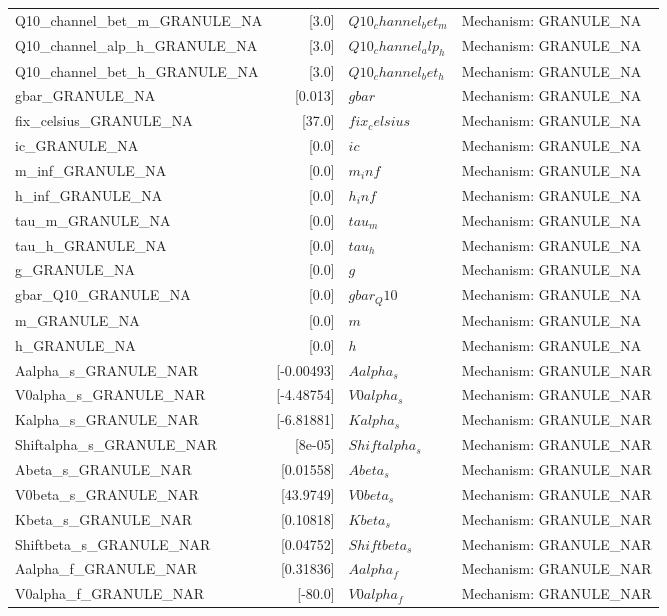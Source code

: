 \begin{tabular}{|l|r|l|l|}
Q10_channel_bet_m_GRANULE_NA & [3.0] & $Q10_channel_bet_m$ & Mechanism: GRANULE_NA \\
Q10_channel_alp_h_GRANULE_NA & [3.0] & $Q10_channel_alp_h$ & Mechanism: GRANULE_NA \\
Q10_channel_bet_h_GRANULE_NA & [3.0] & $Q10_channel_bet_h$ & Mechanism: GRANULE_NA \\
gbar_GRANULE_NA & [0.013] & $gbar$ & Mechanism: GRANULE_NA \\
fix_celsius_GRANULE_NA & [37.0] & $fix_celsius$ & Mechanism: GRANULE_NA \\
ic_GRANULE_NA & [0.0] & $ic$ & Mechanism: GRANULE_NA \\
m_inf_GRANULE_NA & [0.0] & $m_inf$ & Mechanism: GRANULE_NA \\
h_inf_GRANULE_NA & [0.0] & $h_inf$ & Mechanism: GRANULE_NA \\
tau_m_GRANULE_NA & [0.0] & $tau_m$ & Mechanism: GRANULE_NA \\
tau_h_GRANULE_NA & [0.0] & $tau_h$ & Mechanism: GRANULE_NA \\
g_GRANULE_NA & [0.0] & $g$ & Mechanism: GRANULE_NA \\
gbar_Q10_GRANULE_NA & [0.0] & $gbar_Q10$ & Mechanism: GRANULE_NA \\
m_GRANULE_NA & [0.0] & $m$ & Mechanism: GRANULE_NA \\
h_GRANULE_NA & [0.0] & $h$ & Mechanism: GRANULE_NA \\
Aalpha_s_GRANULE_NAR & [-0.00493] & $Aalpha_s$ & Mechanism: GRANULE_NAR \\
V0alpha_s_GRANULE_NAR & [-4.48754] & $V0alpha_s$ & Mechanism: GRANULE_NAR \\
Kalpha_s_GRANULE_NAR & [-6.81881] & $Kalpha_s$ & Mechanism: GRANULE_NAR \\
Shiftalpha_s_GRANULE_NAR & [8e-05] & $Shiftalpha_s$ & Mechanism: GRANULE_NAR \\
Abeta_s_GRANULE_NAR & [0.01558] & $Abeta_s$ & Mechanism: GRANULE_NAR \\
V0beta_s_GRANULE_NAR & [43.9749] & $V0beta_s$ & Mechanism: GRANULE_NAR \\
Kbeta_s_GRANULE_NAR & [0.10818] & $Kbeta_s$ & Mechanism: GRANULE_NAR \\
Shiftbeta_s_GRANULE_NAR & [0.04752] & $Shiftbeta_s$ & Mechanism: GRANULE_NAR \\
Aalpha_f_GRANULE_NAR & [0.31836] & $Aalpha_f$ & Mechanism: GRANULE_NAR \\
V0alpha_f_GRANULE_NAR & [-80.0] & $V0alpha_f$ & Mechanism: GRANULE_NAR \\

\end{tabular}
